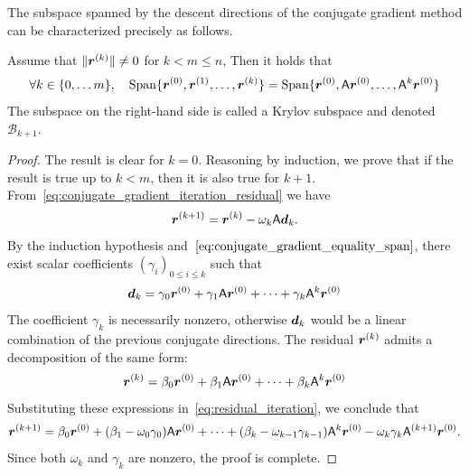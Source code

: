 The subspace spanned by the descent directions of the conjugate gradient method can be characterized precisely as follows.
\begin{proposition}
    \label{proposition:krylov_subspace}
    Assume that $\lVert\mathbf{\boldsymbol{r}}^{(k)}\rVert \neq 0$ for $k < m \leq n$,
    Then it holds that
    \[
        \forall k \in \{0, \dotsc m\}, \quad
        \operatorname{Span}\{ \mathbf{\boldsymbol{r}}^{(0)}, \mathbf{\boldsymbol{r}}^{(1)}, \dotsc, \mathbf{\boldsymbol{r}}^{(k)} \}
        = \operatorname{Span}\{ \mathbf{\boldsymbol{r}}^{(0)}, \mathsf A \mathbf{\boldsymbol{r}}^{(0)}, \dotsc, \mathsf A^k \mathbf{\boldsymbol{r}}^{(0)} \}
    \]
    The subspace on the right-hand side is called a Krylov subspace
    and denoted $\mathcal B_{k+1}$.
\end{proposition}
\begin{proof}
    The result is clear for $k = 0$.
    Reasoning by induction,
    we prove that if the result is true up to $k < m$,
    then it is also true for $k+1$.
    From~\eqref{eq:conjugate_gradient_iteration_residual} we have
    \begin{equation}
        \label{eq:residual_iteration}
        \mathbf{\boldsymbol{r}}^{(k+1)} = \mathbf{\boldsymbol{r}}^{(k)} - \omega_k \mathsf A \mathbf{\boldsymbol{d}}_k.
    \end{equation}
    By the induction hypothesis and~$\eqref{eq:conjugate_gradient_equality_span}$,
    there exist scalar coefficients $(\gamma_i)_{0\leq i \leq k}$ such that
    \[
        \mathbf{\boldsymbol{d}}_k = \gamma_0 \mathbf{\boldsymbol{r}}^{(0)} + \gamma_1 \mathsf A \mathbf{\boldsymbol{r}}^{(0)} + \dotsb + \gamma_{k} \mathsf A^k \mathbf{\boldsymbol{r}}^{(0)}
    \]
    The coefficient $\gamma_k$ is necessarily nonzero,
    otherwise $\mathbf{\boldsymbol{d}}_k$ would be a linear combination of the previous conjugate directions.
    The residual $\mathbf{\boldsymbol{r}}^{(k)}$ admits a decomposition of the same form:
    \[
        \mathbf{\boldsymbol{r}}^{(k)} = \beta_0 \mathbf{\boldsymbol{r}}^{(0)} + \beta_1 \mathsf A \mathbf{\boldsymbol{r}}^{(0)} + \dotsb + \beta_{k} \mathsf A^k \mathbf{\boldsymbol{r}}^{(0)}
    \]
    Substituting these expressions in~\eqref{eq:residual_iteration},
    we conclude that
    \[
        \mathbf{\boldsymbol{r}}^{(k+1)} = \beta_0 \mathbf{\boldsymbol{r}}^{(0)} + (\beta_1 - \omega_0 \gamma_0) \mathsf A \mathbf{\boldsymbol{r}}^{(0)}  + \dotsb + (\beta_k - \omega_{k-1} \gamma_{k-1}) \mathsf A^k \mathbf{\boldsymbol{r}}^{(0)} - \omega_k \gamma_k \mathsf A^{(k+1)} \mathbf{\boldsymbol{r}}^{(0)} .
    \]
    Since both $\omega_k$ and $\gamma_k$ are nonzero,
    the proof is complete.
\end{proof}


